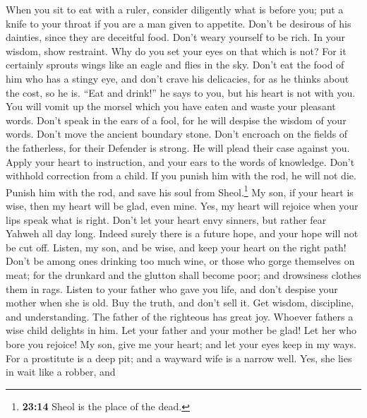  When you sit to eat with a ruler, consider diligently
what is before you;  put a knife to your throat if you are
a man given to appetite.  Don't be desirous of his
dainties, since they are deceitful food.  Don't weary
yourself to be rich. In your wisdom, show restraint.  Why
do you set your eyes on that which is not? For it certainly sprouts
wings like an eagle and flies in the sky.  Don't eat the
food of him who has a stingy eye, and don't crave his delicacies,
 for as he thinks about the cost, so he is. ``Eat and
drink!'' he says to you, but his heart is not with you. 
You will vomit up the morsel which you have eaten and waste your
pleasant words.  Don't speak in the ears of a fool, for he
will despise the wisdom of your words.  Don't move the
ancient boundary stone. Don't encroach on the fields of the fatherless,
 for their Defender is strong. He will plead their case
against you.  Apply your heart to instruction, and your
ears to the words of knowledge.  Don't withhold
correction from a child. If you punish him with the rod, he will not
die.  Punish him with the rod, and save his soul from
Sheol.\footnote{\textbf{23:14} Sheol is the place of the dead.}
 My son, if your heart is wise, then my heart will be
glad, even mine.  Yes, my heart will rejoice when your
lips speak what is right.  Don't let your heart envy
sinners, but rather fear Yahweh all day long.  Indeed
surely there is a future hope, and your hope will not be cut off.
 Listen, my son, and be wise, and keep your heart on the
right path!  Don't be among ones drinking too much wine,
or those who gorge themselves on meat;  for the drunkard
and the glutton shall become poor; and drowsiness clothes them in rags.
 Listen to your father who gave you life, and don't
despise your mother when she is old.  Buy the truth, and
don't sell it. Get wisdom, discipline, and understanding.
 The father of the righteous has great joy. Whoever
fathers a wise child delights in him.  Let your father
and your mother be glad! Let her who bore you rejoice! 
My son, give me your heart; and let your eyes keep in my ways.
 For a prostitute is a deep pit; and a wayward wife is a
narrow well.  Yes, she lies in wait like a robber, and
